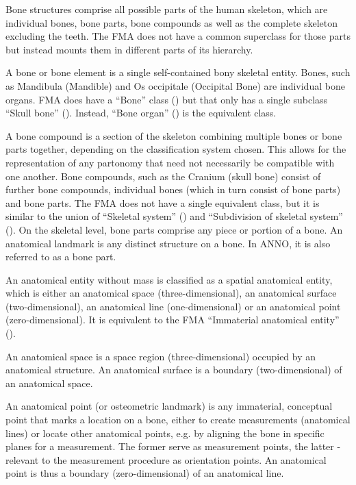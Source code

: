\documentclass[sw]{iosart2x}
\begin{document}
Bone structures comprise all possible parts of the human skeleton, which are individual bones, bone parts, bone compounds as well as the complete skeleton excluding the teeth.
The FMA does not have a common superclass for those parts but instead mounts them in different parts of its hierarchy.

A bone or bone element is a single self-contained bony skeletal entity.
Bones, such as Mandibula (Mandible) and Os occipitale (Occipital Bone) are individual bone organs.
FMA does have a \enquote{Bone} class () but that only has a single subclass \enquote{Skull bone} ().
Instead, \enquote{Bone organ} () is the equivalent class.

A bone compound is a section of the skeleton combining multiple bones or bone parts together, depending on the classification system chosen.
This allows for the representation of any partonomy that need not necessarily be compatible with one another.
Bone compounds, such as the Cranium (skull bone) consist of further bone compounds, individual bones (which in turn consist of bone parts) and bone parts.
The FMA does not have a single equivalent class, but it is similar to the union of \enquote{Skeletal system} () and \enquote{Subdivision of skeletal system} ().
On the skeletal level, bone parts comprise any piece or portion of a bone.
An anatomical landmark is any distinct structure on a bone.
In ANNO, it is also referred to as a bone part.

An anatomical entity without mass is classified as a spatial anatomical entity, which is either an anatomical space (three-dimensional), an anatomical surface (two-dimensional), an anatomical line (one-dimensional) or an anatomical point (zero-dimensional).
It is equivalent to the FMA \enquote{Immaterial anatomical entity} ().

An anatomical space is a space region (three-dimensional) occupied by an anatomical structure.
An anatomical surface is a boundary (two-dimensional) of an anatomical space.

An anatomical point (or osteometric landmark) is any immaterial, conceptual point that marks a location on a bone, either to create measurements (anatomical lines) or locate other anatomical points, e.g. by aligning the bone in specific planes for a measurement.
The former serve as measurement points, the latter - relevant to the measurement procedure as orientation points.
An anatomical point is thus a boundary (zero-dimensional) of an anatomical line.
\end{document}
